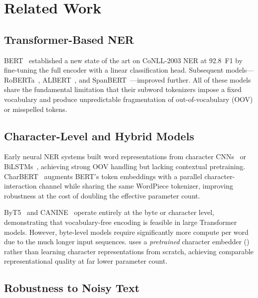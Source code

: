 \section{Related Work}
\label{sec:related}

\subsection{Transformer-Based NER}

BERT~\citep{devlin2019bert} established a new state of the art on CoNLL-2003
NER at 92.8~F1 by fine-tuning the full encoder with a linear classification
head.  Subsequent models---RoBERTa~\citep{liu2019roberta},
ALBERT~\citep{lan2020albert}, and SpanBERT~\citep{joshi2020spanbert}---improved
further.  All of these models share the fundamental limitation that their
subword tokenizers impose a fixed vocabulary and produce unpredictable
fragmentation of out-of-vocabulary (OOV) or misspelled tokens.

\subsection{Character-Level and Hybrid Models}

Early neural NER systems built word representations from character
CNNs~\citep{ma2016end} or BiLSTMs~\citep{lample2016neural}, achieving strong
OOV handling but lacking contextual pretraining.  CharBERT~\citep{ma2020charbert}
augments BERT's token embeddings with a parallel character-interaction channel
while sharing the same WordPiece tokenizer, improving robustness at the cost
of doubling the effective parameter count.

ByT5~\citep{xue2022byt5} and CANINE~\citep{clark2022canine} operate entirely
at the byte or character level, demonstrating that vocabulary-free encoding is
feasible in large Transformer models.  However, byte-level models require
significantly more compute per word due to the much longer input sequences.
\LightRet{} uses a \emph{pretrained} character embedder (\RetVec{}) rather
than learning character representations from scratch, achieving comparable
representational quality at far lower parameter count.

\subsection{Robustness to Noisy Text}

